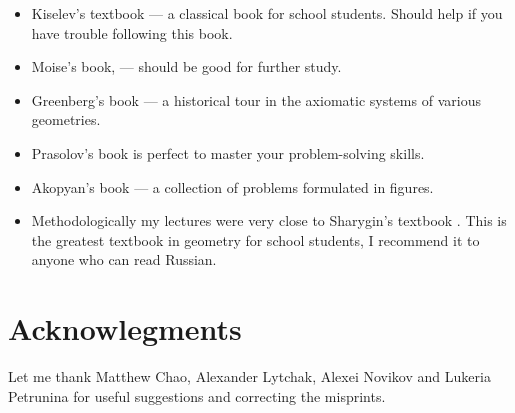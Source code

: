\begin{itemize}
\item Kiselev's textbook \cite{kiselev} ---
a classical book for school students.
Should help if you have trouble following this book.

\item Moise's book, \cite{moise} ---
should be good for further study.

\item Greenberg's book \cite{greenberg}  --- a historical tour in the axiomatic systems of various geometries.

\item Prasolov's book \cite{prasolov} is perfect to master your problem-solving skills.

\item Akopyan's book \cite{akopyan} --- a collection of problems formulated in figures.

\item Methodologically my lectures
were very close to Sharygin's  textbook \cite{sharygin}.
This is the greatest textbook in geometry for school students,
I recommend it to anyone who can read Russian.


\end{itemize}

\section*{Acknowlegments}
Let me thank  
Matthew Chao, 
Alexander Lytchak,
Alexei Novi\-kov
and Lukeria Petrunina
for useful suggestions and correcting the misprints.





